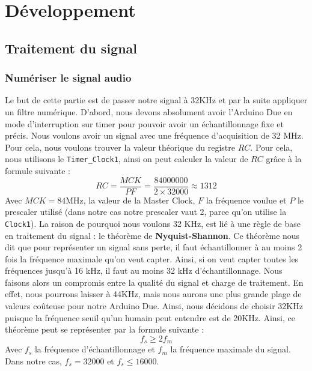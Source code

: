 \documentclass[a4paper,11pt]{article}
\begin{document}
\section{Développement}
			
\subsection{Traitement du signal} \label{traitement}

\subsubsection{Numériser le signal audio} \label{numeriser}

Le but de cette partie est de passer notre signal à 32KHz et par la suite appliquer un filtre numérique. D'abord, nous devons absolument avoir l’Arduino Due en mode d’interruption sur timer pour pouvoir avoir un échantillonnage fixe et précis. Nous voulons avoir un signal avec une fréquence d'acquisition de 32 MHz. Pour cela, nous voulons trouver la valeur théorique du registre $RC$. Pour cela, nous utilisons le \texttt{Timer\_Clock1}, ainsi on peut calculer la valeur de $RC$ grâce à la formule suivante : 
\begin{equation} \label{eq:rc}
	RC = \frac{MCK}{PF} = \frac{84000000}{2 \times 32000} \approx 1312
\end{equation}
Avec $MCK = 84 \text{MHz}$, la valeur de la Master Clock, $F$ la fréquence voulue et $P$ le prescaler utilisé (dans notre cas notre prescaler vaut 2, parce qu'on utilise la \texttt{Clock1}). La raison de pourquoi nous voulons 32 KHz, est lié à une règle de base en traitement du signal : le théorème de \textbf{Nyquist-Shannon}. Ce théorème nous dit que pour représenter un signal sans perte, il faut échantillonner à au moins 2 fois la fréquence maximale qu'on veut capter. Ainsi, si on veut capter toutes les fréquences jusqu’à 16 kHz, il faut au moins 32 kHz d’échantillonnage. Nous faisons alors un compromis entre la qualité du signal et charge de traitement. En effet, nous pourrons laisser à 44KHz, mais nous aurons une plus grande plage de valeurs coûteuse pour notre Arduino Due. Ainsi, nous décidons de choisir 32KHz puisque la fréquence seuil qu'un humain peut entendre est de 20KHz. Ainsi, ce théorème peut se représenter par la formule suivante : 
\begin{equation}
	f_s \geq 2f_m
\end{equation}
Avec $f_s$ la fréquence d'échantillonnage et $f_m$ la fréquence maximale du signal. Dans notre cas, $f_s = 32000$ et $f_s \leq 16000$. 
\end{document}
